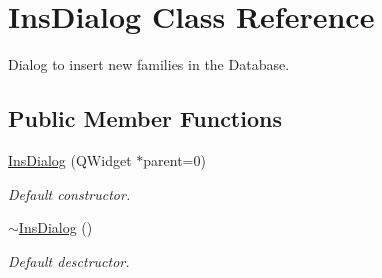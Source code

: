 \hypertarget{class_ins_dialog}{\section{Ins\+Dialog Class Reference}
\label{class_ins_dialog}
}


Dialog to insert new families in the Database.  


\subsection*{Public Member Functions}
\begin{DoxyCompactItemize}
\item 
\hyperlink{class_ins_dialog_a4a3cd89b0f67e2ef788333272106125a}{Ins\+Dialog} (Q\+Widget $\ast$parent=0)
\begin{DoxyCompactList}\small\item\em Default constructor. \end{DoxyCompactList}\item 
\hyperlink{class_ins_dialog_a9c15fe45d3d2c9eaa484df2213b791e2}{$\sim$\+Ins\+Dialog} ()
\begin{DoxyCompactList}\small\item\em Default desctructor. \end{DoxyCompactList}\end{DoxyCompactItemize}
